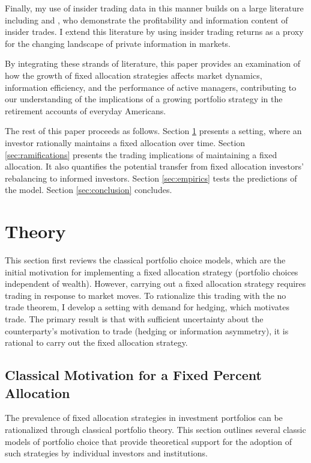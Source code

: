 \documentclass[12pt]{article}
\begin{document}
\par Finally, my use of insider trading data in this manner builds on a large literature including \citet{Seyhun1998} and \citet{PIOTROSKI}, who demonstrate the profitability and information content of insider trades. I extend this literature by using insider trading returns as a proxy for the changing landscape of private information in markets.

\par By integrating these strands of literature, this paper provides an examination of how the growth of fixed allocation strategies affects market dynamics, information efficiency, and the performance of active managers, contributing to our understanding of the implications of a growing portfolio strategy in the retirement accounts of everyday Americans.


\par The rest of this paper proceeds as follows. Section \ref{sec:theory} presents a setting, where an investor rationally maintains a fixed allocation over time. Section \ref{sec:ramifications} presents the trading implications of maintaining a fixed allocation. It also quantifies the potential transfer from fixed allocation investors' rebalancing to informed investors. Section \ref{sec:empirics} tests the predictions of the model. Section \ref{sec:conclusion} concludes.

\section{Theory} \label{sec:theory}

This section first reviews the classical portfolio choice models, which are the initial motivation for implementing a fixed allocation strategy (portfolio choices independent of wealth). However, carrying out a fixed allocation strategy requires trading in response to market moves. To rationalize this trading with the \citet{MILGROM198217} no trade theorem, I develop a setting with demand for hedging, which motivates trade. The primary result
is that with sufficient uncertainty about the counterparty's motivation to trade (hedging or information asymmetry), it is rational to carry out the fixed allocation strategy.

\subsection{Classical Motivation for a Fixed Percent Allocation}

\par The prevalence of fixed allocation strategies in investment portfolios can be rationalized through classical portfolio theory. This section outlines several classic models of portfolio choice that provide theoretical support for the adoption of such strategies by individual investors and institutions.
\end{document}
